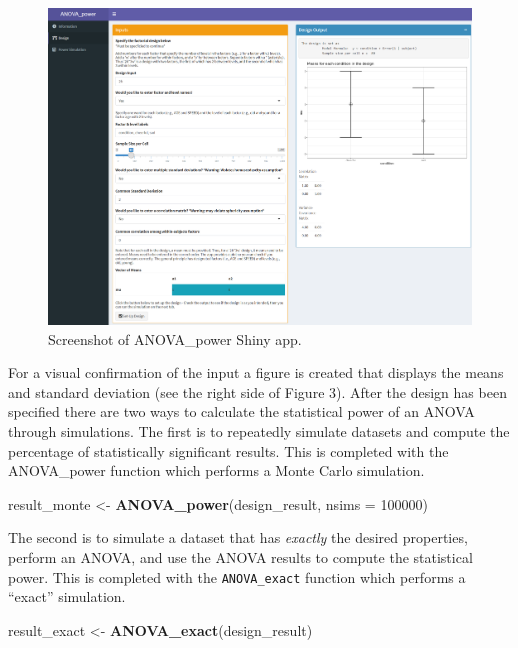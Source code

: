 \documentclass[
  ,jou,floatsintext]{apa6}
\newenvironment{Shaded}{\begin{snugshade}}{\end{snugshade}}
\newcommand{\DataTypeTok}[1]{\textcolor[rgb]{0.13,0.29,0.53}{#1}}
\newcommand{\DecValTok}[1]{\textcolor[rgb]{0.00,0.00,0.81}{#1}}
\newcommand{\KeywordTok}[1]{\textcolor[rgb]{0.13,0.29,0.53}{\textbf{#1}}}
\newcommand{\NormalTok}[1]{#1}
\newcommand{\StringTok}[1]{\textcolor[rgb]{0.31,0.60,0.02}{#1}}
\begin{document}
\begin{figure}
\centering
\includegraphics{screenshots/anova_power.png}
\caption{Screenshot of ANOVA\_power Shiny app.}
\end{figure}

For a visual confirmation of the input a figure is created that displays the means and standard deviation (see the right side of Figure 3).
After the design has been specified there are two ways to calculate the statistical power of an ANOVA through simulations.
The first is to repeatedly simulate datasets and compute the percentage of statistically significant results. This is completed with the ANOVA\_power function which performs a Monte Carlo simulation.

\begin{Shaded}
\begin{Highlighting}[]
\NormalTok{result_monte <-}\StringTok{ }\KeywordTok{ANOVA_power}\NormalTok{(design_result, }
                            \DataTypeTok{nsims =} \DecValTok{100000}\NormalTok{)}
\end{Highlighting}
\end{Shaded}

The second is to simulate a dataset that has \emph{exactly} the desired properties, perform an ANOVA, and use the ANOVA results to compute the statistical power. This is completed with the \texttt{ANOVA\_exact} function which performs a \enquote{exact} simulation.

\begin{Shaded}
\begin{Highlighting}[]
\NormalTok{result_exact <-}\StringTok{ }\KeywordTok{ANOVA_exact}\NormalTok{(design_result)}
\end{Highlighting}
\end{Shaded}
\end{document}
